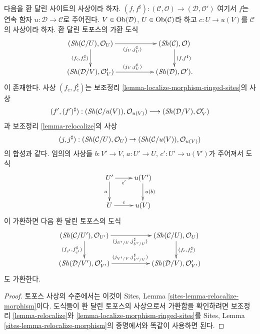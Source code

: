 \begin{lemma}
\label{lemma-relocalize-morphism-ringed-sites}
다음을 환 달린 사이트의 사상이라 하자.
$(f, f^\sharp) :
(\mathcal{C}, \mathcal{O})
\longrightarrow
(\mathcal{D}, \mathcal{O}')$
여기서 $f$는 연속 함자 $u : \mathcal{D} \to \mathcal{C}$로 주어진다.
$V \in \mathop{\mathrm{Ob}}\nolimits(\mathcal{D})$, $U \in \mathop{\mathrm{Ob}}\nolimits(\mathcal{C})$라 하고
$c : U \to u(V)$를 $\mathcal{C}$의 사상이라 하자. 환 달린 토포스의
가환 도식
$$
\xymatrix{
(\Sh(\mathcal{C}/U), \mathcal{O}_U)
\ar[rr]_{(j_U, j_U^\sharp)} \ar[d]_{(f_c, f_c^\sharp)} & &
(\Sh(\mathcal{C}), \mathcal{O}) \ar[d]^{(f, f^\sharp)} \\
(\Sh(\mathcal{D}/V), \mathcal{O}'_V)
\ar[rr]^{(j_V, j_V^\sharp)} & &
(\Sh(\mathcal{D}), \mathcal{O}').
}
$$
이 존재한다. 사상 $(f_c, f_c^\sharp)$는 보조정리
\ref{lemma-localize-morphism-ringed-sites}의 사상
$$
(f', (f')^\sharp) :
(\mathop{\mathit{Sh}}\nolimits(\mathcal{C}/u(V)), \mathcal{O}_{u(V)})
\longrightarrow
(\mathop{\mathit{Sh}}\nolimits(\mathcal{D}/V), \mathcal{O}'_V)
$$
과 보조정리 \ref{lemma-relocalize}의 사상
$$
(j, j^\sharp) :
(\mathop{\mathit{Sh}}\nolimits(\mathcal{C}/U), \mathcal{O}_U)
\to
(\mathop{\mathit{Sh}}\nolimits(\mathcal{C}/u(V)), \mathcal{O}_{u(V)})
$$
의 합성과 같다. 임의의 사상들 $b : V' \to V$, $a : U' \to U$,
$c' : U' \to u(V')$가 주어져서 도식
$$
\xymatrix{
U' \ar[r]_-{c'} \ar[d]_a & u(V') \ar[d]^{u(b)} \\
U \ar[r]^-c & u(V)
}
$$
이 가환하면 다음 환 달린 토포스의 도식
$$
\xymatrix{
(\Sh(\mathcal{C}/U'), \mathcal{O}_{U'})
\ar[rr]_{(j_{U'/U}, j_{U'/U}^\sharp)} \ar[d]_{(f_{c'}, f_{c'}^\sharp)} & &
(\Sh(\mathcal{C}/U), \mathcal{O}_U)
\ar[d]^{(f_c, f_c^\sharp)} \\
(\Sh(\mathcal{D}/V'), \mathcal{O}'_{V'})
\ar[rr]^{(j_{V'/V}, j_{V'/V}^\sharp)} & &
(\Sh(\mathcal{D}/V), \mathcal{O}'_{V'})
}
$$
도 가환한다.
\end{lemma}

\begin{proof}
토포스 사상의 수준에서는 이것이 Sites, Lemma
\ref{sites-lemma-relocalize-morphism}이다. 도식들이 환 달린 토포스의
사상으로서 가환함을 확인하려면 보조정리 \ref{lemma-relocalize}와
\ref{lemma-localize-morphism-ringed-sites}를 Sites, Lemma
\ref{sites-lemma-relocalize-morphism}의 증명에서와 똑같이 사용하면 된다.
\end{proof}
















